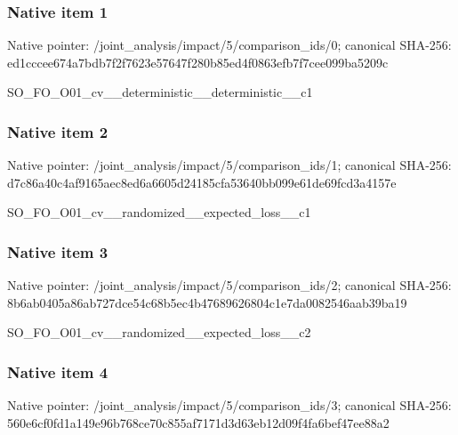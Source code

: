 \documentclass[10pt,a4paper]{article}
\begin{document}
\subsubsection{Native item 1}
Native pointer: /joint\_\allowbreak{}analysis/impact/5/comparison\_\allowbreak{}ids/0; canonical SHA-256: ed1cccee674a7bdb7f2f7623e57647f280b85ed4f0863efb7f7cee099ba5209c

\begingroup\raggedright\sloppy SO\_\allowbreak{}FO\_\allowbreak{}O01\_\allowbreak{}cv\_\allowbreak{}\_\allowbreak{}deterministic\_\allowbreak{}\_\allowbreak{}deterministic\_\allowbreak{}\_\allowbreak{}c1\par\endgroup

\subsubsection{Native item 2}
Native pointer: /joint\_\allowbreak{}analysis/impact/5/comparison\_\allowbreak{}ids/1; canonical SHA-256: d7c86a40c4af9165aec8ed6a6605d24185cfa53640bb099e61de69fcd3a4157e

\begingroup\raggedright\sloppy SO\_\allowbreak{}FO\_\allowbreak{}O01\_\allowbreak{}cv\_\allowbreak{}\_\allowbreak{}randomized\_\allowbreak{}\_\allowbreak{}expected\_\allowbreak{}loss\_\allowbreak{}\_\allowbreak{}c1\par\endgroup

\subsubsection{Native item 3}
Native pointer: /joint\_\allowbreak{}analysis/impact/5/comparison\_\allowbreak{}ids/2; canonical SHA-256: 8b6ab0405a86ab727dce54c68b5ec4b47689626804c1e7da0082546aab39ba19

\begingroup\raggedright\sloppy SO\_\allowbreak{}FO\_\allowbreak{}O01\_\allowbreak{}cv\_\allowbreak{}\_\allowbreak{}randomized\_\allowbreak{}\_\allowbreak{}expected\_\allowbreak{}loss\_\allowbreak{}\_\allowbreak{}c2\par\endgroup

\subsubsection{Native item 4}
Native pointer: /joint\_\allowbreak{}analysis/impact/5/comparison\_\allowbreak{}ids/3; canonical SHA-256: 560e6cf0fd1a149e96b768ce70c855af7171d3d63eb12d09f4fa6bef47ee88a2
\end{document}
